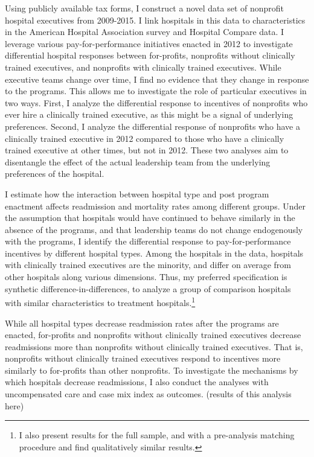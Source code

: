 \documentclass[12pt]{article}
\begin{document}
  Using publicly available tax forms, I construct a novel data set of nonprofit hospital executives from 2009-2015. I link hospitals in this data to characteristics in the American Hospital Association survey and Hospital Compare data. I leverage various pay-for-performance initiatives enacted in 2012 to investigate differential hospital responses between for-profits, nonprofits without clinically trained executives, and nonprofits with clinically trained executives. While executive teams change over time, I find no evidence that they change in response to the programs. This allows me to investigate the role of particular executives in two ways. First, I analyze the differential response to incentives of nonprofits who ever hire a clinically trained executive, as this might be a signal of underlying preferences. Second, I analyze the differential response of nonprofits who have a clinically trained executive in 2012 compared to those who have a clinically trained executive at other times, but not in 2012. These two analyses aim to disentangle the effect of the actual leadership team from the underlying preferences of the hospital. 
  
  I estimate how the interaction between hospital type and post program enactment affects readmission and mortality rates among different groups. Under the assumption that hospitals would have continued to behave similarly in the absence of the programs, and that leadership teams do not change endogenously with the programs, I identify the differential response to pay-for-performance incentives by different hospital types. Among the hospitals in the data, hospitals with clinically trained executives are the minority, and differ on average from other hospitals along various dimensions. Thus, my preferred specification is synthetic difference-in-differences, to analyze a group of comparison hospitals with similar characteristics to treatment hospitals.\footnote{I also present results for the full sample, and with a pre-analysis matching procedure and find qualitatively similar results.} 
  
   While all hospital types decrease readmission rates after the programs are enacted, for-profits and nonprofits without clinically trained executives decrease readmissions more than nonprofits without clinically trained executives. That is, nonprofits without clinically trained executives respond to incentives more similarly to for-profits than other nonprofits. To investigate the mechanisms by which hospitals decrease readmissions, I also conduct the analyses with uncompensated care and case mix index as outcomes. (results of this analysis here)
\end{document}
